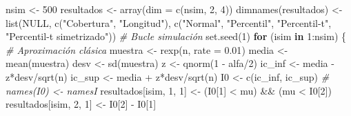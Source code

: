 \documentclass[
]{book}
\newenvironment{Shaded}{\begin{snugshade}}{\end{snugshade}}
\newcommand{\AttributeTok}[1]{\textcolor[rgb]{0.77,0.63,0.00}{#1}}
\newcommand{\CommentTok}[1]{\textcolor[rgb]{0.56,0.35,0.01}{\textit{#1}}}
\newcommand{\ConstantTok}[1]{\textcolor[rgb]{0.00,0.00,0.00}{#1}}
\newcommand{\ControlFlowTok}[1]{\textcolor[rgb]{0.13,0.29,0.53}{\textbf{#1}}}
\newcommand{\DecValTok}[1]{\textcolor[rgb]{0.00,0.00,0.81}{#1}}
\newcommand{\FloatTok}[1]{\textcolor[rgb]{0.00,0.00,0.81}{#1}}
\newcommand{\FunctionTok}[1]{\textcolor[rgb]{0.00,0.00,0.00}{#1}}
\newcommand{\NormalTok}[1]{#1}
\newcommand{\OtherTok}[1]{\textcolor[rgb]{0.56,0.35,0.01}{#1}}
\newcommand{\SpecialCharTok}[1]{\textcolor[rgb]{0.00,0.00,0.00}{#1}}
\newcommand{\StringTok}[1]{\textcolor[rgb]{0.31,0.60,0.02}{#1}}
\theoremstyle{break}
\theoremstyle{definition}
\theoremstyle{definition}
\theoremstyle{definition}
\theoremstyle{definition}
\theoremstyle{remark}
\begin{document}
\begin{Shaded}
\begin{Highlighting}[]
\NormalTok{nsim }\OtherTok{\textless{}{-}} \DecValTok{500}
\NormalTok{resultados }\OtherTok{\textless{}{-}} \FunctionTok{array}\NormalTok{(}\AttributeTok{dim =} \FunctionTok{c}\NormalTok{(nsim, }\DecValTok{2}\NormalTok{, }\DecValTok{4}\NormalTok{))}
\FunctionTok{dimnames}\NormalTok{(resultados) }\OtherTok{\textless{}{-}} \FunctionTok{list}\NormalTok{(}\ConstantTok{NULL}\NormalTok{, }\FunctionTok{c}\NormalTok{(}\StringTok{"Cobertura"}\NormalTok{, }\StringTok{"Longitud"}\NormalTok{),}
        \FunctionTok{c}\NormalTok{(}\StringTok{"Normal"}\NormalTok{, }\StringTok{"Percentil"}\NormalTok{, }\StringTok{"Percentil{-}t"}\NormalTok{, }\StringTok{"Percentil{-}t simetrizado"}\NormalTok{))}
\CommentTok{\# Bucle simulación}
\FunctionTok{set.seed}\NormalTok{(}\DecValTok{1}\NormalTok{)}
\ControlFlowTok{for}\NormalTok{ (isim }\ControlFlowTok{in} \DecValTok{1}\SpecialCharTok{:}\NormalTok{nsim) \{}
    \CommentTok{\# Aproximación clásica}
\NormalTok{    muestra }\OtherTok{\textless{}{-}} \FunctionTok{rexp}\NormalTok{(n, }\AttributeTok{rate =} \FloatTok{0.01}\NormalTok{)}
\NormalTok{    media }\OtherTok{\textless{}{-}} \FunctionTok{mean}\NormalTok{(muestra)}
\NormalTok{    desv }\OtherTok{\textless{}{-}} \FunctionTok{sd}\NormalTok{(muestra)}
\NormalTok{    z }\OtherTok{\textless{}{-}} \FunctionTok{qnorm}\NormalTok{(}\DecValTok{1} \SpecialCharTok{{-}}\NormalTok{ alfa}\SpecialCharTok{/}\DecValTok{2}\NormalTok{)}
\NormalTok{    ic\_inf }\OtherTok{\textless{}{-}}\NormalTok{ media }\SpecialCharTok{{-}}\NormalTok{ z}\SpecialCharTok{*}\NormalTok{desv}\SpecialCharTok{/}\FunctionTok{sqrt}\NormalTok{(n)}
\NormalTok{    ic\_sup }\OtherTok{\textless{}{-}}\NormalTok{ media }\SpecialCharTok{+}\NormalTok{ z}\SpecialCharTok{*}\NormalTok{desv}\SpecialCharTok{/}\FunctionTok{sqrt}\NormalTok{(n)}
\NormalTok{    I0 }\OtherTok{\textless{}{-}} \FunctionTok{c}\NormalTok{(ic\_inf, ic\_sup)}
    \CommentTok{\# names(I0) \textless{}{-} namesI}
\NormalTok{    resultados[isim, }\DecValTok{1}\NormalTok{, }\DecValTok{1}\NormalTok{] }\OtherTok{\textless{}{-}}\NormalTok{ (I0[}\DecValTok{1}\NormalTok{] }\SpecialCharTok{\textless{}}\NormalTok{ mu) }\SpecialCharTok{\&\&}\NormalTok{ (mu }\SpecialCharTok{\textless{}}\NormalTok{ I0[}\DecValTok{2}\NormalTok{])}
\NormalTok{    resultados[isim, }\DecValTok{2}\NormalTok{, }\DecValTok{1}\NormalTok{] }\OtherTok{\textless{}{-}}\NormalTok{ I0[}\DecValTok{2}\NormalTok{] }\SpecialCharTok{{-}}\NormalTok{ I0[}\DecValTok{1}\NormalTok{]}
    

\end{Highlighting}
\end{Shaded}
\end{document}
